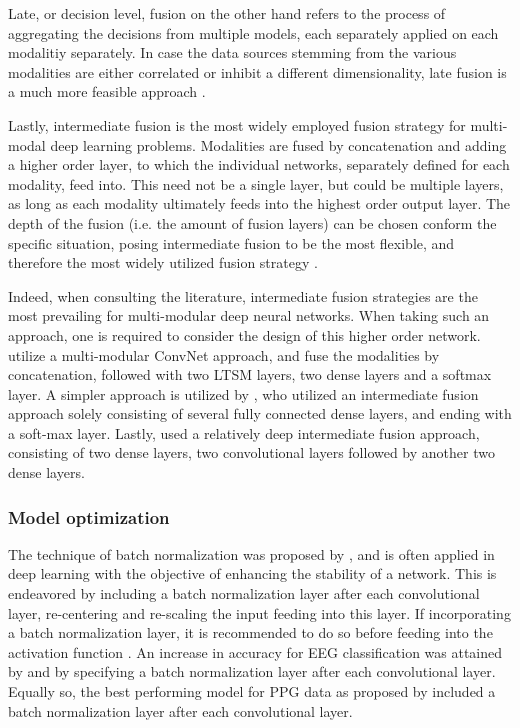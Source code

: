 \documentclass[12pt]{article}
\begin{document}
Late, or decision level, fusion on the other hand refers to the process of aggregating the decisions from multiple models, each separately applied on each modalitiy separately. In case the data sources stemming from the various modalities are either correlated or inhibit a different dimensionality, late fusion is a much more feasible approach \cite{ramachandram2017deep}.

Lastly, intermediate fusion is the most widely employed fusion strategy for multi-modal deep learning problems. Modalities are fused by concatenation and adding a higher order layer, to which the individual networks, separately defined for each modality, feed into. This need not be a single layer, but could be multiple layers, as long as each modality ultimately feeds into the highest order output layer. The depth of the fusion (i.e. the amount of fusion layers) can be chosen conform the specific situation, posing intermediate fusion to be the most flexible, and therefore the most widely utilized fusion strategy \cite{ramachandram2017deep}.

Indeed, when consulting the literature, intermediate fusion strategies are the most prevailing for multi-modular deep neural networks. When taking such an approach, one is required to consider the design of this higher order network.  utilize a multi-modular ConvNet approach, and fuse the modalities by concatenation, followed with two LTSM layers, two dense layers and a softmax layer. A simpler approach is utilized by	, who utilized an intermediate fusion approach solely consisting of several fully connected dense layers, and ending with a soft-max layer. Lastly,  used a relatively deep intermediate fusion approach, consisting of two dense layers, two convolutional layers followed by another two dense layers.  

\subsubsection{Model optimization}
The technique of batch normalization was proposed by  ,  and is often applied in deep learning with the objective of enhancing the stability of a network. This is endeavored by including a batch normalization layer after each convolutional layer, re-centering and re-scaling the input feeding into this layer. If incorporating a batch normalization layer, it is recommended to do so before feeding into the activation function \cite{ioffe2015batch}. An increase in accuracy for EEG classification was attained by  and  by specifying a batch normalization layer after each convolutional layer. Equally so, the best performing model for PPG data as proposed by  included a batch normalization layer after each convolutional layer.  
\end{document}

